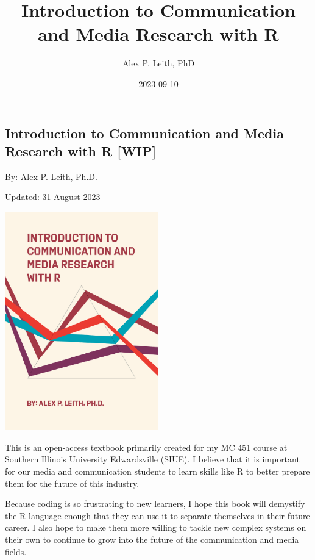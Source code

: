 \documentclass[
  b5paper]{book}
\title{Introduction to Communication and Media Research with R}
\author{Alex P. Leith, PhD}
\date{2023-09-10}
\begin{document}
\maketitle

{
\setcounter{tocdepth}{1}
\tableofcontents
}
\hypertarget{section}{%
\chapter*{}\label{section}}

\hypertarget{introduction-to-communication-and-media-research-with-r-wip}{%
\section*{Introduction to Communication and Media Research with R {[}WIP{]}}\label{introduction-to-communication-and-media-research-with-r-wip}}

By: Alex P. Leith, Ph.D.

Updated: 31-August-2023

\href{Current\%20Book\%20Cover\%20(Art\%20created\%20with\%20R\textquotesingle{}s\%20aRtsy\%20package)}{\includegraphics[width=0.5\textwidth,height=\textheight]{cover_2.png}}

This is an open-access textbook primarily created for my MC 451 course at Southern Illinois University Edwardsville (SIUE). I believe that it is important for our media and communication students to learn skills like R to better prepare them for the future of this industry.

Because coding is so frustrating to new learners, I hope this book will demystify the R language enough that they can use it to separate themselves in their future career. I also hope to make them more willing to tackle new complex systems on their own to continue to grow into the future of the communication and media fields.
\end{document}
